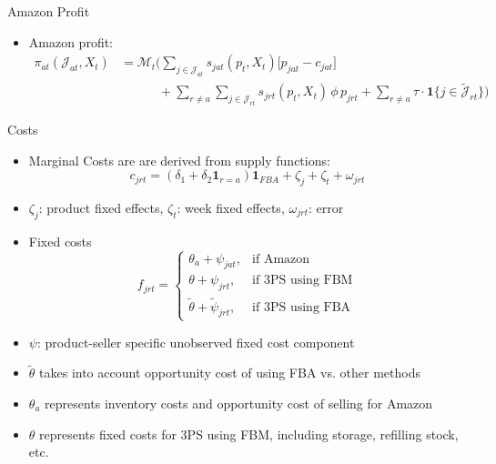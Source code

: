 \documentclass[aspectratio=169,professionalfonts]{beamer}
\newcommand{\beq}[1]{\begin{equation}\label{#1}}
\newcommand{\eeq}{\end{equation}}
\begin{document}
\begin{frame}{Amazon Profit}
  \begin{itemize}
    \item Amazon profit:
    \begin{align}
      \pi_{at}(\mathcal{J}_{at}, X_t)
      &= \mathcal{M}_t \Bigg(
        \sum_{j\in\mathcal{J}_{at}} s_{jat}(p_t, X_t)\big[p_{jat} - c_{jat}\big] \\
      &\qquad\quad
        + \sum_{r\ne a}\sum_{j\in\mathcal{J}_{rt}} s_{jrt}(p_t, X_t)\,\phi\,p_{jrt}
        + \sum_{r\ne a} \tau \cdot \mathbf{1}\{j\in\tilde{\mathcal{J}}_{rt}\}
      \Bigg)
    \end{align}
  \end{itemize}
\end{frame}

\begin{frame}{Costs}
  \begin{itemize}
    \item Marginal Costs are are derived from supply functions:
    \beq{eq:marginal_cost}
      c_{jrt} = (\delta_1 + \delta_2 \mathbf{1}_{r=a})\mathbf{1}_{FBA} + \zeta_j + \zeta_t + \omega_{jrt}
    \eeq
    \item $\zeta_j$: product fixed effects, $\zeta_t$: week fixed effects, $\omega_{jrt}$: error
    \item Fixed costs
    \beq{eq:fixed_cost}
      f_{jrt} = \begin{cases}
        \theta_a + \psi_{jat}, & \text{if Amazon} \\
        \theta + \psi_{jrt}, & \text{if 3PS using FBM} \\
        \tilde{\theta} + \tilde{\psi}_{jrt}, & \text{if 3PS using FBA}
      \end{cases}
    \eeq
    \item $\psi$: product-seller specific unobserved fixed cost component
    \item $\tilde{\theta}$ takes into account opportunity cost of using FBA vs. other methods
    \item $\theta_a$ represents inventory costs and opportunity cost of selling for Amazon
    \item $\theta$ represents fixed costs for 3PS using FBM, including storage, refilling stock, etc.
  \end{itemize}
\end{frame}
\end{document}

